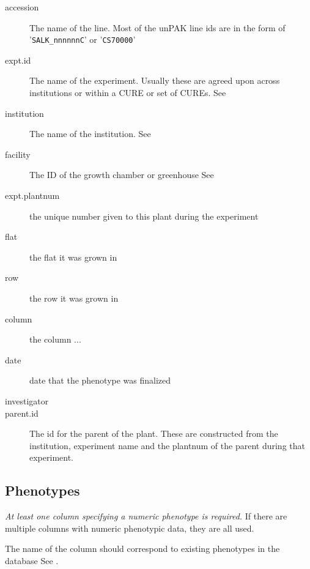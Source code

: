 \begin{description}

\item[accession] The name of the line.  Most of the unPAK line ids are
  in the form of '\texttt{SALK\_nnnnnnC}' or '\texttt{CS70000}'

\item[expt.id] The name of the experiment.  Usually these are agreed
  upon across institutions or within a CURE or set of CUREs.  See 

\item[institution] The name of the institution. See 
  
\item[facility]  The ID of the growth chamber or greenhouse See 

\item[expt.plantnum] the unique number given to this plant during the experiment

\item[flat] the flat it was grown in

\item[row] the row it was grown in

\item[column] the column ...

\item[date] date that the phenotype was finalized

\item[investigator] 
  \item[parent.id] The id for the parent of the plant.  These are
  constructed from the institution, experiment name and the plantnum
  of the parent during that experiment.  

\end{description}

\subsection*{Phenotypes}
\emph{At least one column specifying a numeric phenotype is required.}  If
there are multiple columns with numeric phenotypic data, they are all
used.

The name of the column should correspond to existing phenotypes in the database 
See .

